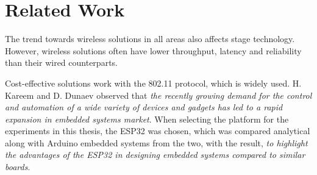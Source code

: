   
\chapter{Related Work}



The trend towards wireless solutions in all areas also affects stage technology.
However, wireless solutions often have lower throughput, latency and reliability than their wired counterparts.

Cost-effective solutions work with the 802.11 protocol, which is widely used. 
H. Kareem and D. Dunaev \cite{TheWorkingPrincipalsOfESP32} observed that
\emph{the recently growing demand for the control and automation of a wide variety of devices and gadgets has
led to a rapid expansion in embedded systems market}.
When selecting the platform for the experiments in this thesis, the ESP32 was chosen, 
which was compared analytical along with Arduino embedded systems from the two,
with the result, \emph{to highlight the advantages of the ESP32 in designing embedded systems compared to similar boards}.


